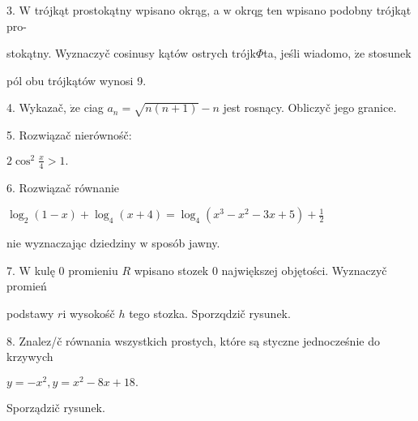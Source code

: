 \documentclass[a4paper,12pt]{article}
\begin{document}
3. $\mathrm{W}$ trójkąt prostokątny wpisano okrąg, a $\mathrm{w}$ okrqg ten wpisano podobny trójkąt pro-

stokątny. Wyznaczyč cosinusy kątów ostrych trójk$\Phi$ta, jeśli wiadomo, $\dot{\mathrm{z}}\mathrm{e}$ stosunek

pól obu trójkątów wynosi 9.

4. Wykazač, $\dot{\mathrm{z}}\mathrm{e}$ ciag $a_{n}=\sqrt{n(n+1)}-n$ jest rosnący. Obliczyč jego granice.

5. Rozwiązač nierównośč:

$2\displaystyle \cos^{2}\frac{x}{4}>1.$

6. Rozwiązač równanie

$\displaystyle \log_{2}(1-x)+\log_{4}(x+4)=\log_{4}(x^{3}-x^{2}-3x+5)+\frac{1}{2}$

nie wyznaczając dziedziny $\mathrm{w}$ sposób jawny.

7. $\mathrm{W}$ kulę $0$ promieniu $R$ wpisano stozek $0$ największej objętości. Wyznaczyč promień

podstawy $r\mathrm{i}$ wysokośč $h$ tego stozka. Sporzqdzič rysunek.

8. Znalez/č równania wszystkich prostych, które są styczne jednocześnie do krzywych

$y=-x^{2},y=x^{2}-8x+18.$

Sporządzič rysunek.
\end{document}
